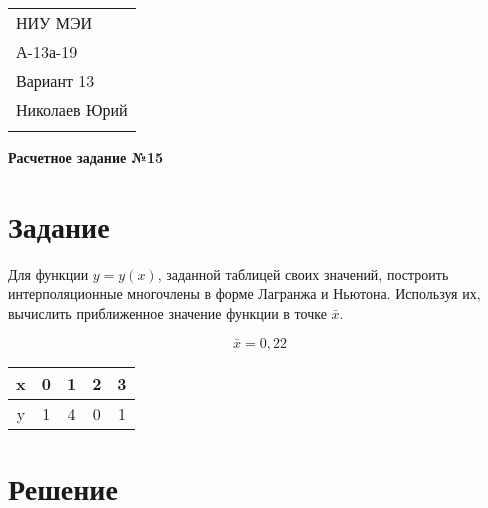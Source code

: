 \documentclass[a4paper,12pt]{article} %
\begin{document}
\thispagestyle{empty} 

\begin{tabular}{p{15.5cm}} 
НИУ МЭИ \\ А-13а-19  \\ Вариант 13 \\ Николаев Юрий\\
\hline 
\\
\end{tabular} 

\vspace*{0.3cm}

\begin{center} 
	{\Large \bf Расчетное задание №15} 
	\vspace{2mm}
\end{center}  

\vspace{0.4cm}


\section{Задание}
Для функции $y = y(x)$, заданной таблицей своих значений, построить интерполяционные многочлены в форме Лагранжа и Ньютона. Используя их, вычислить приближенное значение функции в точке $\bar x$. 

$$\bar x = 0,22$$

\begin{center}
\begin{tabular}{| c | c | c | c | c |}
\hline
    x & 0 & 1 & 2 & 3 \\ \hline
    y & 1 & 4 & 0 & 1 \\
\hline
\end{tabular}
\end{center}

\section{Решение}
\end{document}
